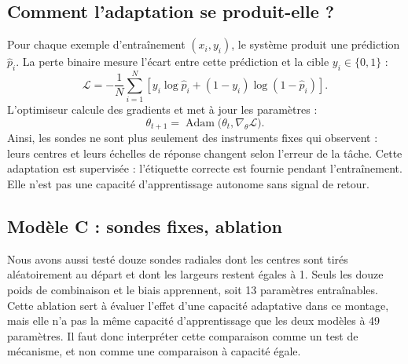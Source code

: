 \documentclass[11pt,a4paper]{article}
\begin{document}
\subsection{Comment l'adaptation se produit-elle ?}
Pour chaque exemple d'entraînement $(x_i,y_i)$, le système produit une prédiction $\hat p_i$. La perte binaire mesure l'écart entre cette prédiction et la cible $y_i\in\{0,1\}$ :
\[
 \mathcal L=-\frac1N\sum_{i=1}^N\left[y_i\log\hat p_i+(1-y_i)\log(1-\hat p_i)\right].
\]
L'optimiseur calcule des gradients et met à jour les paramètres :
\[
 \theta_{t+1}=\operatorname{Adam}\bigl(\theta_t,\nabla_{\theta}\mathcal L\bigr).
\]
Ainsi, les sondes ne sont plus seulement des instruments fixes qui observent : leurs centres et leurs échelles de réponse changent selon l'erreur de la tâche. Cette adaptation est supervisée : l'étiquette correcte est fournie pendant l'entraînement. Elle n'est pas une capacité d'apprentissage autonome sans signal de retour.

\subsection{Modèle C : sondes fixes, ablation}
Nous avons aussi testé douze sondes radiales dont les centres sont tirés aléatoirement au départ et dont les largeurs restent égales à 1. Seuls les douze poids de combinaison et le biais apprennent, soit 13 paramètres entraînables. Cette ablation sert à évaluer l'effet d'une capacité adaptative dans ce montage, mais elle n'a pas la même capacité d'apprentissage que les deux modèles à 49 paramètres. Il faut donc interpréter cette comparaison comme un test de mécanisme, et non comme une comparaison à capacité égale.
\end{document}
